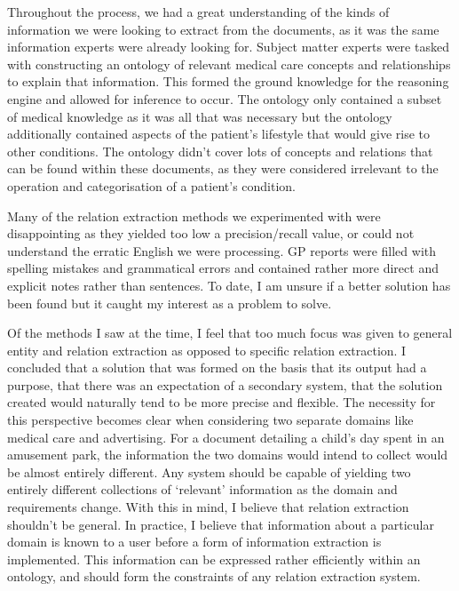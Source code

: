 \documentclass{ecmm427_assignment}
\begin{document}
Throughout the process, we had a great understanding of the kinds of information we were looking to extract from the documents, as it was the same information experts were already looking for. Subject matter experts were tasked with constructing an ontology of relevant medical care concepts and relationships to explain that information. This formed the ground knowledge for the reasoning engine and allowed for inference to occur. The ontology only contained a subset of medical knowledge as it was all that was necessary but the ontology additionally contained aspects of the patient's lifestyle that would give rise to other conditions. The ontology didn't cover lots of concepts and relations that can be found within these documents, as they were considered irrelevant to the operation and categorisation of a patient's condition.

Many of the relation extraction methods we experimented with were disappointing as they yielded too low a precision/recall value, or could not understand the erratic English we were processing. GP reports were filled with spelling mistakes and grammatical errors and contained rather more direct and explicit notes rather than sentences. To date, I am unsure if a better solution has been found but it caught my interest as a problem to solve.

Of the methods I saw at the time, I feel that too much focus was given to general entity and relation extraction as opposed to specific relation extraction. I concluded that a solution that was formed on the basis that its output had a purpose, that there was an expectation of a secondary system, that the solution created would naturally tend to be more precise and flexible. The necessity for this perspective becomes clear when considering two separate domains like medical care and advertising. For a  document detailing a child's day spent in an amusement park, the information the two domains would intend to collect would be almost entirely different. Any system should be capable of yielding two entirely different collections of `relevant' information as the domain and requirements change. With this in mind, I believe that relation extraction shouldn't be general. In practice, I believe that information about a particular domain is known to a user before a form of information extraction is implemented. This information can be expressed rather efficiently within an ontology, and should form the constraints of any relation extraction system.\\
\end{document}
